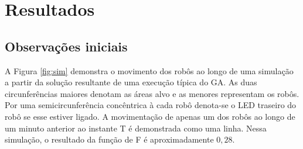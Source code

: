 \chapter{Resultados}
\label{cha:results}

\section{Observações iniciais}

A Figura \ref{fig:sim} demonstra o movimento dos robôs ao longo de uma simulação a partir da solução resultante de uma execução típica do GA. As duas circunferências maiores denotam as áreas alvo e as menores representam os robôs. Por uma semicircunferência concêntrica à cada robô denota-se o LED traseiro do robô se esse estiver ligado. A movimentação de apenas um dos robôs ao longo de um minuto anterior ao instante T é demonstrada como uma linha. Nessa simulação, o resultado da função de \fitness F é aproximadamente $0,28$.

